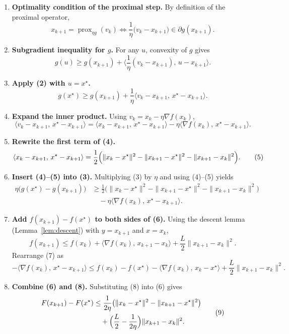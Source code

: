 \documentclass{article}
\begin{document}
\begin{enumerate}[label=[Step \arabic*], leftmargin=*]
\item \textbf{Optimality condition of the proximal step.}  
By definition of the proximal operator,
\[
x_{k+1}= \operatorname{prox}_{\eta g}(v_{k})
\iff
\frac{1}{\eta}\bigl(v_{k}-x_{k+1}\bigr)\in\partial g(x_{k+1}).\tag{1}
\]

\item \textbf{Subgradient inequality for $g$.}  
For any $u$, convexity of $g$ gives
\[
g(u)\ge g(x_{k+1})+\Big\langle\frac{1}{\eta}(v_{k}-x_{k+1}),\,u-x_{k+1}\Big\rangle.\tag{2}
\]

\item \textbf{Apply (2) with $u=x^{\star}$.}  
\[
g(x^{\star})\ge g(x_{k+1})+\frac{1}{\eta}\langle v_{k}-x_{k+1},\,x^{\star}-x_{k+1}\rangle.\tag{3}
\]

\item \textbf{Expand the inner product.}  
Using $v_{k}=x_{k}-\eta\nabla f(x_{k})$,
\[
\langle v_{k}-x_{k+1},\,x^{\star}-x_{k+1}\rangle
= \langle x_{k}-x_{k+1},\,x^{\star}-x_{k+1}\rangle-\eta\langle\nabla f(x_{k}),\,x^{\star}-x_{k+1}\rangle.\tag{4}
\]

\item \textbf{Rewrite the first term of (4).}  
\[
\langle x_{k}-x_{k+1},\,x^{\star}-x_{k+1}\rangle
=\frac{1}{2}\Bigl(\|x_{k}-x^{\star}\|^{2}-\|x_{k+1}-x^{\star}\|^{2}-\|x_{k+1}-x_{k}\|^{2}\Bigr).\tag{5}
\]

\item \textbf{Insert (4)–(5) into (3).}  
Multiplying (3) by $\eta$ and using (4)–(5) yields
\[
\begin{aligned}
\eta\bigl(g(x^{\star})-g(x_{k+1})\bigr)
&\ge\frac{1}{2}\bigl(\|x_{k}-x^{\star}\|^{2}-\|x_{k+1}-x^{\star}\|^{2}-\|x_{k+1}-x_{k}\|^{2}\bigr)\\
&\quad-\eta\langle\nabla f(x_{k}),\,x^{\star}-x_{k+1}\rangle.\tag{6}
\end{aligned}
\]

\item \textbf{Add $f(x_{k+1})-f(x^{\star})$ to both sides of (6).}  
Using the descent lemma (Lemma~\ref{lem:descent}) with $y=x_{k+1}$ and $x=x_{k}$,
\[
f(x_{k+1})\le f(x_{k})+\langle\nabla f(x_{k}),\,x_{k+1}-x_{k}\rangle+\frac{L}{2}\|x_{k+1}-x_{k}\|^{2}.\tag{7}
\]
Rearrange (7) as
\[
-\langle\nabla f(x_{k}),\,x^{\star}-x_{k+1}\rangle
\le f(x_{k})-f(x^{\star})-\langle\nabla f(x_{k}),\,x_{k}-x^{\star}\rangle
+\frac{L}{2}\|x_{k+1}-x_{k}\|^{2}.\tag{8}
\]

\item \textbf{Combine (6) and (8).}  
Substituting (8) into (6) gives
\[
\begin{aligned}
F(x_{k+1})-F(x^{\star})
&\le \frac{1}{2\eta}\bigl(\|x_{k}-x^{\star}\|^{2}-\|x_{k+1}-x^{\star}\|^{2}\bigr)\\
&\quad+\Bigl(\frac{L}{2}-\frac{1}{2\eta}\Bigr)\|x_{k+1}-x_{k}\|^{2}.
\end{aligned}\tag{9}
\]


\end{enumerate}
\end{document}
